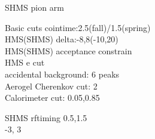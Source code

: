 \documentclass[aspectratio=169,xcolor=dvipsnames]{beamer}
\begin{document}
\begin{frame}{SHMS pion arm}
  \begin{block}{Basic cuts}
    cointime:2.5(fall)/1.5(spring) \\
    HMS(SHMS) delta:-8,8(-10,20) \\
    HMS(SHMS) acceptance constrain \\
    HMS e cut \\
    accidental background: 6 peaks \\
       Aerogel Cherenkov cut: 2 \\
       Calorimeter cut: 0.05,0.85
  \end{block}
     \begin{block}{SHMS rftiming}
       0.5,1.5 \\ 
       -3\sigma, 3\sigma
     \end{block}

\end{frame}
\end{document}
